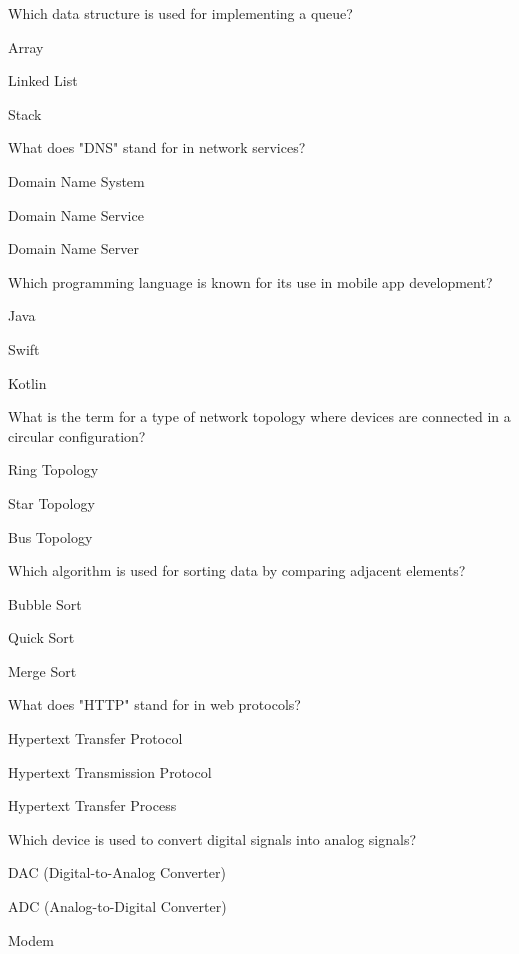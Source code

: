 \begin{enhancedmcq}{Which data structure is used for implementing a queue?}
\item Array
\item Linked List
\item Stack

\end{enhancedmcq}
\begin{enhancedmcq}{What does "DNS" stand for in network services?}
\item Domain Name System
\item Domain Name Service
\item Domain Name Server

\end{enhancedmcq}
\begin{enhancedmcq}{Which programming language is known for its use in mobile app development?}
\item Java
\item Swift
\item Kotlin

\end{enhancedmcq}
\begin{enhancedmcq}{What is the term for a type of network topology where devices are connected in a circular configuration?}
\item Ring Topology
\item Star Topology
\item Bus Topology

\end{enhancedmcq}
\begin{enhancedmcq}{Which algorithm is used for sorting data by comparing adjacent elements?}
\item Bubble Sort
\item Quick Sort
\item Merge Sort

\end{enhancedmcq}
\begin{enhancedmcq}{What does "HTTP" stand for in web protocols?}
\item Hypertext Transfer Protocol
\item Hypertext Transmission Protocol
\item Hypertext Transfer Process

\end{enhancedmcq}
\begin{enhancedmcq}{Which device is used to convert digital signals into analog signals?}
\item DAC (Digital-to-Analog Converter)
\item ADC (Analog-to-Digital Converter)
\item Modem

\end{enhancedmcq}
